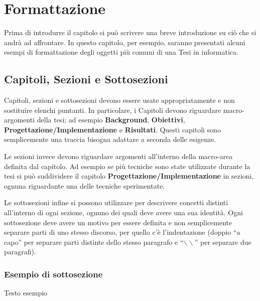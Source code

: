 \chapter{Formattazione}\label{chapter:formattazione}
Prima di introdurre il capitolo si può scrivere una breve introduzione su ciò che si andrà ad affrontare.
In questo capitolo, per esempio, saranno presentati alcuni esempi di formattazione degli oggetti più comuni di una Tesi in informatica.


\section{Capitoli, Sezioni e Sottosezioni}\label{sec:cap_sec_subsec}
Capitoli, sezioni e sottosezioni devono essere usate appropriatamente e non sostituire elenchi puntanti.
In particolare, i Capitoli devono riguardare macro-argomenti della tesi; ad esempio \textbf{Background}, \textbf{Obiettivi}, \textbf{Progettazione/Implementazione} e \textbf{Risultati}.
Questi capitoli sono semplicemente una traccia bisogna adattare a seconda delle esigenze.

Le sezioni invece devono riguardare argomenti all'interno della macro-area definita dal capitolo.
Ad esempio se più tecniche sono state utilizzate durante la tesi si può suddividere il capitolo \textbf{Progettazione/Implementazione} in sezioni, ognuna riguardante una delle tecniche sperimentate.

Le sottosezioni infine si possono utilizzare per descrivere concetti distinti all'interno di ogni sezione, ognuno dei quali deve avere una sua identità.
Ogni sottosezione deve avere un motivo per essere definita e non semplicemente separare parti di uno stesso discorso, per quello c'è l'indentazione (doppio ``a capo'' per separare parti distinte dello stesso paragrafo e ``$\backslash\backslash$'' per separare due paragrafi).

\subsection{Esempio di sottosezione}\label{subsec:es_subsec}
Testo esempio

